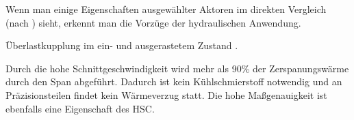\documentclass[12pt,a4paper,halfparskip,titlepage]{scrreprt}
\begin{document}
Wenn man einige Eigenschaften ausgewählter Aktoren im direkten Vergleich (nach \cite{ia:7-2007}) sieht, erkennt man die Vorzüge der hydraulischen Anwendung.

Überlastkupplung im ein- und ausgerastetem Zustand \cite{dennig:diss}.

Durch die hohe Schnittgeschwindigkeit wird mehr als 90\% der Zerspanungswärme durch den Span abgeführt. Dadurch ist kein Kühlschmierstoff notwendig und an Präzisionsteilen findet kein Wärmeverzug statt. Die hohe Maßgenauigkeit ist ebenfalls eine Eigenschaft des \cite{fachkundebuchmetall} HSC.



\end{document}
